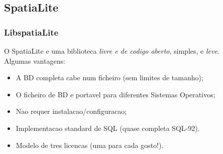 \documentclass[hyperref={pdfpagelabels=true}]{beamer}
\begin{document}
\subsection{SpatiaLite}
\begin{frame}
\frametitle{LibspatiaLite}
O SpatiaLite e uma biblioteca \textit{livre e de codigo aberto}, simples, e \textit{leve}.\\
Algumas vantagens:
    \begin{itemize}
      \item<2-> A BD completa cabe num ficheiro (sem limites de tamanho);
      \item<3-> O ficheiro de BD e portavel para diferentes Sistemas Operativos;
      \item<4-> Nao requer instalacao/configuracao;
      \item<5-> Implementacao standard de SQL (quase completa SQL-92).      
      \item<6-> Modelo de tres licencas (uma para cada gosto!).      
    \end{itemize}
\end{frame}
\end{document}

